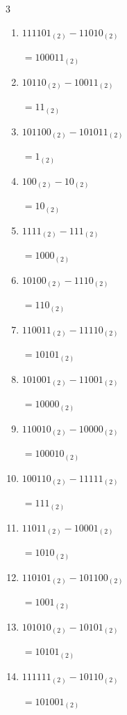 \begin{multicols}{3}
\begin{enumerate}
        $=1001_{(2)}$

  \item $111101_{(2)} - 11010_{(2)}$

        $=100011_{(2)}$

  \item $10110_{(2)} - 10011_{(2)}$

        $=11_{(2)}$

  \item $101100_{(2)} - 101011_{(2)}$

        $=1_{(2)}$

  \item $100_{(2)} - 10_{(2)}$

        $=10_{(2)}$

  \item $1111_{(2)} - 111_{(2)}$

        $=1000_{(2)}$

  \item $10100_{(2)} - 1110_{(2)}$

        $=110_{(2)}$

  \item $110011_{(2)} - 11110_{(2)}$

        $=10101_{(2)}$

\columnbreak %

  \item $101001_{(2)} - 11001_{(2)}$

        $=10000_{(2)}$

  \item $110010_{(2)} - 10000_{(2)}$

        $=100010_{(2)}$

  \item $100110_{(2)} - 11111_{(2)}$

        $=111_{(2)}$

  \item $11011_{(2)} - 10001_{(2)}$

        $=1010_{(2)}$

  \item $110101_{(2)} - 101100_{(2)}$

        $=1001_{(2)}$

  \item $101010_{(2)} - 10101_{(2)}$

        $=10101_{(2)}$

  \item $111111_{(2)} - 10110_{(2)}$

        $=101001_{(2)}$


\end{enumerate}
\end{multicols}
